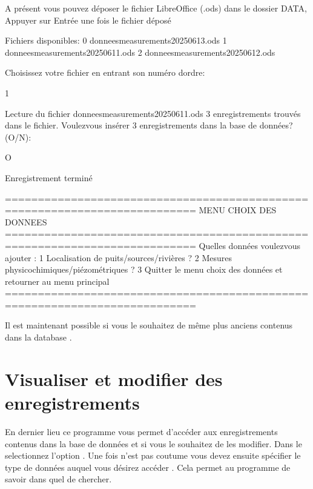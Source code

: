\documentclass[letterpaper,10pt,french]{sphinxmanual}
\begin{document}
\begin{sphinxVerbatim}[commandchars=\\\{\}]
A présent vous pouvez déposer le fichier LibreOffice (.ods) dans le dossier DATA, Appuyer sur Entrée une fois le fichier déposé

Fichiers disponibles:
0 \PYGZhy{} donnees\PYGZus{}measurements\PYGZus{}2025\PYGZhy{}06\PYGZhy{}13.ods
1 \PYGZhy{} donnees\PYGZus{}measurements\PYGZus{}2025\PYGZhy{}06\PYGZhy{}11.ods
2 \PYGZhy{} donnees\PYGZus{}measurements\PYGZus{}2025\PYGZhy{}06\PYGZhy{}12.ods

Choisissez votre fichier en entrant son numéro d\PYGZsq{}ordre:

\PYGZhy{}\PYGZgt{} 1

Lecture du fichier donnees\PYGZus{}measurements\PYGZus{}2025\PYGZhy{}06\PYGZhy{}11.ods
3 enregistrements trouvés dans le fichier.
Voulez\PYGZhy{}vous insérer 3 enregistrements dans la base de données? (O/N):

\PYGZhy{}\PYGZgt{} O

Enregistrement terminé

===========================================================================
MENU CHOIX DES DONNEES
===========================================================================
Quelles données voulez\PYGZhy{}vous ajouter :
1 \PYGZhy{} Localisation de puits/sources/rivières ?
2 \PYGZhy{} Mesures physico\PYGZhy{}chimiques/piézométriques ?
3 \PYGZhy{} Quitter le menu choix des données et retourner au menu principal
===========================================================================
\end{sphinxVerbatim}

\sphinxAtStartPar
Il est maintenant possible si vous le souhaitez de {\hyperref[\detokenize{modifydata:modify}]{}} même plus anciens contenus dans la database .

\sphinxstepscope


\chapter{Visualiser et modifier des enregistrements}
\label{\detokenize{modifydata:visualiser-et-modifier-des-enregistrements}}\label{\detokenize{modifydata:modify}}\label{\detokenize{modifydata::doc}}
\sphinxAtStartPar
En dernier lieu ce programme vous permet d’accéder aux enregistrements contenus dans la base de données et si vous le souhaitez
de les modifier. Dans le  selectionnez l’option . Une fois n’est
pas coutume vous devez ensuite spécifier le type de données auquel vous désirez accéder . Cela permet au programme de savoir dans quel
 de  chercher.
\end{document}
